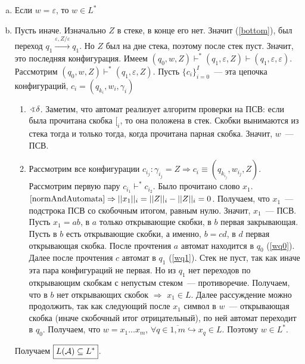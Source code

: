 \documentclass[a4paper]{article}
\def\A{{\cal A}}
\begin{document}
\begin{enumerate}
\begin{enumerate}[a.]
\item Если $w=\varepsilon$, то $w\in L^*$
\item Пусть иначе. Изначально $Z$ в стеке, в конце его нет. Значит (\ref{bottom}), был переход $q_1\overset{\varepsilon
,Z/\varepsilon}{\longrightarrow}q_1$. Но $Z$ был на дне стека, поэтому после стек пуст. Значит, это последняя конфигурация. Имеем $(q_0,w,Z)\vdash^*(q_1,\varepsilon,Z)\vdash(q_1,\varepsilon,\varepsilon)$. Рассмотрим $(q_0,w,Z)\vdash^*(q_1,\varepsilon,Z)$. Пусть $\{c_i\}_{i=0}^I$~--- эта цепочка конфигураций, $c_i=(q_{k_i},w_i,\gamma_i)$\begin{enumerate}
\item $\varangle \delta$. Заметим, что автомат реализует алгоритм проверки на ПСВ: если была прочитана скобка $[_i$, то она положена в стек. Скобки вынимаются из стека тогда и только тогда, когда прочитана парная скобка. Значит, $w$~--- ПСВ.
\item Рассмотрим все конфигурации $c_{i_j}\colon \gamma_{i_j}=Z\Rightarrow c_i\equiv (q_{k_{i_j}},w_{i_j},Z)$. Рассмотрим первую пару $c_{i_1}\vdash^*c_{i_{2}}$. Было прочитано слово $x_1$. $\ref{normAndAutomata}\Rightarrow ||x_1||_i=||Z||_i-||Z||_i=0$. Получаем, что  $x_1$~--- подстрока ПСВ со скобочным итогом, равным нулю. Значит, $x_1$~--- ПСВ. Пусть $x_1=ab$, в $a$ только открывающие скобки, в $b$ первая закрывающая. Пусть в $b$ есть открывающие скобки, а именно, $b=cd$, в $d$ первая открывающая скобка. После прочтения $a$ автомат находится в $q_0$ (\ref{wq0}). Далее после прочтения $c$ автомат в $q_1$ (\ref{wq1}). Стек не пуст, так как иначе эта пара конфигураций не первая. Но из $q_1$ нет переходов по открывающим скобкам с непустым стеком~--- противоречие. Получаем, что в $b$ нет открывающих скобок $\Rightarrow$ $x_1\in L$. Далее рассуждение можно продолжить, так как следующий после $x_1$ символ в $w$~--- открывающая скобка (иначе скобочный итог отрицательный), по ней автомат переходит в $q_0$.\newline
Получаем, что $w=x_1...x_m$, $\forall q\in\overline{1,m}\hookrightarrow x_q\in L$. Поэтому $w\in L^*$.
\end{enumerate}
Получаем $\boxed{L(\A)\subseteq L^*}$.
\end{enumerate}
\end{enumerate}
\end{document}
